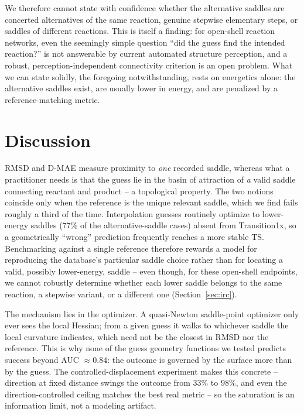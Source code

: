 \documentclass[11pt]{article}
\begin{document}
We therefore cannot state with
confidence whether the
alternative saddles are concerted alternatives of the same reaction, genuine
stepwise elementary steps, or saddles of different reactions. This is itself a
finding: for open-shell reaction networks, even the seemingly simple question
``did the guess find the intended reaction?'' is not answerable by current
automated structure perception, and a robust, perception-independent connectivity
criterion is an open problem. What we can state solidly, the foregoing
notwithstanding, rests on energetics alone: the alternative saddles exist, are
usually lower in energy, and are penalized by a reference-matching metric.

\section{Discussion}

RMSD and D-MAE measure proximity to \emph{one} recorded saddle, whereas what a
practitioner needs is that the guess lie in the basin of attraction of \emph{a}
valid saddle connecting reactant and product -- a topological property. The two
notions coincide only when the reference is the unique relevant saddle, which we
find fails roughly a third of the time. Interpolation guesses routinely optimize
to lower-energy saddles ($77\%$ of the alternative-saddle cases) absent from
Transition1x, so a geometrically ``wrong'' prediction frequently reaches a more
stable TS. Benchmarking against a single reference therefore rewards a model for
reproducing the database's particular saddle choice rather than for locating a
valid, possibly lower-energy, saddle -- even though, for these open-shell endpoints, we
cannot robustly determine whether each lower saddle belongs to the same reaction,
a stepwise variant, or a different one (Section~\ref{sec:irc}).

The mechanism lies in the optimizer. A quasi-Newton saddle-point optimizer only
ever sees the local Hessian; from a
given guess it walks to whichever saddle the local curvature indicates, which need
not be the closest in RMSD nor the reference. This is why none of the guess
geometry functions we tested predicts success beyond AUC $\approx 0.84$: the
outcome is governed by the surface more than by the guess. The controlled-displacement experiment makes this
concrete -- direction at fixed distance swings the outcome from $33\%$ to $98\%$,
and even the direction-controlled ceiling matches the best real metric -- so the
saturation is an information limit, not a modeling artifact.
\end{document}
